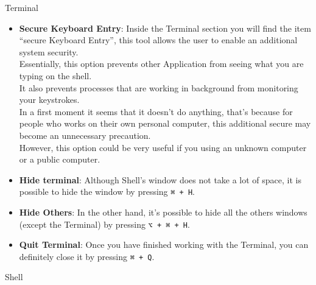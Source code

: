 \documentclass[hidelinks,12pt,a4paper,numbers=enddot]{scrartcl}
\begin{document}
Terminal



\begin{itemize}
    \item \textbf{Secure Keyboard Entry}:
        Inside the Terminal section you will find the item “secure Keyboard Entry”, this tool
        allows the user to enable an additional system security.\\
        Essentially, this option prevents other Application from seeing what you are
        typing on the shell.\\
        It also prevents processes that are working in background from
        monitoring your keystrokes.\\
        In a first moment it seems that it doesn’t do anything, that’s because for
        people who works on their own personal computer, this additional secure may
        become an unnecessary precaution.\\
        However, this option could be very useful if you using an unknown computer
        or a public computer.
    
    \item \textbf{Hide terminal}:
        Although Shell’s window does not take a lot of space, it is possible to hide
        the window by pressing \texttt{⌘ + H}.
    
    \item \textbf{Hide Others}:
        In the other hand, it’s possible to hide all the others windows (except the Terminal) by
        pressing  \texttt{⌥ + ⌘ + H}.
    
    \item \textbf{Quit Terminal}:
        Once you have finished working with the Terminal, you can definitely close it by
        pressing  \texttt{⌘ + Q}.
    
\end{itemize}

Shell
\end{document}
